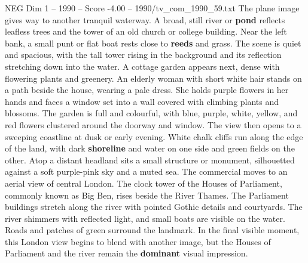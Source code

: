 \begin{textsample}{NEG Dim 1 – 1990 – Score -4.00 – 1990/tv\_com\_1990\_59.txt}
The plane image gives way to another tranquil waterway.
A broad, still river or \textbf{pond} reflects leafless trees and the tower of an old church or college building.
Near the left bank, a small punt or flat boat rests close to \textbf{reeds} and grass.
The scene is quiet and spacious, with the tall tower rising in the background and its reflection stretching down into the water.
A cottage garden appears next, dense with flowering plants and greenery.
An elderly woman with short white hair stands on a path beside the house, wearing a pale dress.
She holds purple flowers in her hands and faces a window set into a wall covered with climbing plants and blossoms.
The garden is full and colourful, with blue, purple, white, yellow, and red flowers clustered around the doorway and window.
The view then opens to a sweeping coastline at dusk or early evening.
White chalk cliffs run along the edge of the land, with dark \textbf{shoreline} and water on one side and green fields on the other.
Atop a distant headland sits a small structure or monument, silhouetted against a soft purple-pink sky and a muted sea.
The commercial moves to an aerial view of central London.
The clock tower of the Houses of Parliament, commonly known as Big Ben, rises beside the River Thames.
The Parliament buildings stretch along the river with pointed Gothic details and courtyards.
The river shimmers with reflected light, and small boats are visible on the water.
Roads and patches of green surround the landmark.
In the final visible moment, this London view begins to blend with another image, but the Houses of Parliament and the river remain the \textbf{dominant} visual impression.

\end{textsample}
